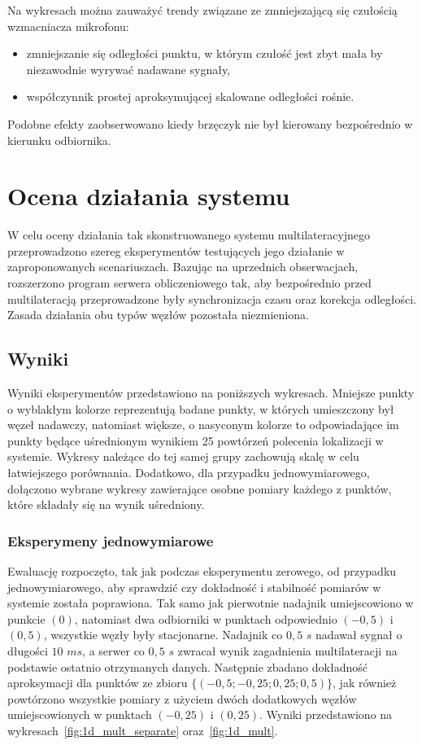 Na wykresach można zauważyć trendy związane ze zmniejszającą się czułością wzmacniacza mikrofonu:

\begin{itemize}
    \item zmniejszanie się odległości punktu, w którym czułość jest zbyt mała by niezawodnie wyrywać nadawane sygnały,
    \item współczynnik prostej aproksymującej skalowane odległości rośnie.
\end{itemize}

Podobne efekty zaobserwowano kiedy brzęczyk nie był kierowany bezpośrednio w kierunku odbiornika.

\section{Ocena działania systemu}

W celu oceny działania tak skonstruowanego systemu multilateracyjnego przeprowadzono szereg eksperymentów testujących jego działanie   w zaproponowanych scenariuszach. Bazując na uprzednich obserwacjach, rozszerzono program serwera obliczeniowego tak, aby bezpośrednio przed multilateracją przeprowadzone były synchronizacja czasu oraz korekcja odległości. Zasada działania obu typów węzłów pozostała niezmieniona.

\subsection{Wyniki}

Wyniki eksperymentów przedstawiono na  poniższych wykresach. Mniejsze punkty o wyblakłym kolorze reprezentują badane punkty, w których umieszczony był węzeł nadawczy, natomiast większe, o nasyconym kolorze to odpowiadające im punkty będące uśrednionym wynikiem 25 powtórzeń polecenia lokalizacji w systemie. Wykresy należące do tej samej grupy zachowują skalę w celu łatwiejszego porównania. Dodatkowo, dla przypadku jednowymiarowego, dołączono wybrane wykresy zawierające osobne pomiary każdego z punktów, które składały się na wynik uśredniony.

\subsubsection{Eksperymeny jednowymiarowe}\label{sec:1d}

Ewaluację rozpoczęto, tak jak podczas eksperymentu zerowego, od przypadku jednowymiarowego, aby sprawdzić czy dokładność i stabilność pomiarów w systemie została poprawiona. Tak samo jak pierwotnie nadajnik umiejscowiono w punkcie $(0)$, natomiast dwa odbiorniki w punktach odpowiednio $(-0,5)$ i $(0,5)$, wszystkie węzły były stacjonarne. Nadajnik co $0,5$ $s$ nadawał sygnał o długości $10$ $ms$, a serwer co $0,5$ $s$ zwracał wynik zagadnienia multilateracji na podstawie ostatnio otrzymanych danych. Następnie zbadano dokładność aproksymacji dla punktów ze zbioru $\{(-0,5; -0,25; 0,25; 0,5)\}$, jak również powtórzono wszystkie pomiary z użyciem dwóch dodatkowych węzłów umiejscowionych w punktach $(-0,25)$ i $(0,25)$. Wyniki przedstawiono na wykresach~\ref{fig:1d_mult_separate} oraz~\ref{fig:1d_mult}.

